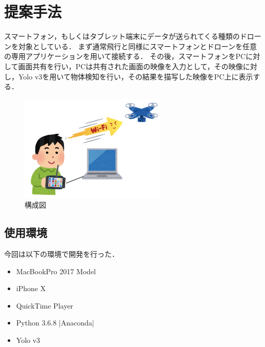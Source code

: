 \section{提案手法}
スマートフォン，もしくはタブレット端末にデータが送られてくる種類のドローンを対象としている．
まず通常飛行と同様にスマートフォンとドローンを任意の専用アプリケーションを用いて接続する．
その後，スマートフォンをPCに対して画面共有を行い，PCは共有された画面の映像を入力として，その映像に対し，Yolo v3を用いて物体検知を行い，その結果を描写した映像をPC上に表示する．
\begin{figure}[htbp]
  \begin{center}
    \includegraphics[clip,width=7.0cm]{img/sys-struct.png}
    \caption{構成図}
    \label{fig:struct}
  \end{center}
\end{figure}


\subsection{使用環境}
今回は以下の環境で開発を行った．
\begin{itemize}
  \item MacBookPro 2017 Model
  \item iPhone X
  \item QuickTime Player
  \item Python 3.6.8 |Anaconda|
  \item Yolo v3
\end{itemize}



